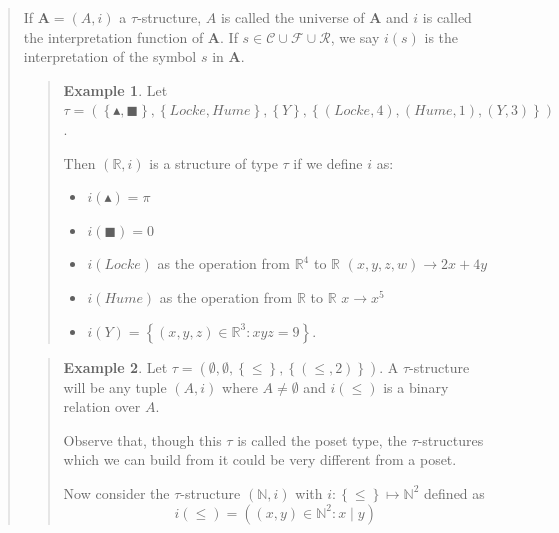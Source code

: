 \documentclass[a4paper, 12pt]{article}
\theoremstyle{definition}
\theoremstyle{definition}
\newtheorem{example}{Example}
\theoremstyle{definition}
\begin{document}
\begin{quote}
If $\textbf{A} = (A, i)$ a $\tau$-structure, $A$ is called the universe of
$\textbf{A}$ and $i$ is called the interpretation function of $\textbf{A}$.
If $s \in \mathcal{C} \cup \mathcal{F} \cup \mathcal{R}$, we say $i(s)$
is the interpretation of the symbol $s$ in $\textbf{A}$.


\small
\begin{quote}

\begin{example}
    Let $\tau = \left( \left\{ \blacktriangle, \blacksquare \right\}, \left\{
    Locke, Hume \right\}, \left\{ Y \right\}, \left\{ (Locke, 4), (Hume, 1),
(Y, 3) \right\}     \right) $.

Then $(\mathbb{R}, i)$ is a structure of type $\tau$ if we define $i$ as: 

\begin{itemize}
    \item $i(\blacktriangle) = \pi$
    \item $i(\blacksquare) = 0$
    \item $i(Locke)$ as the operation from $\mathbb{R}^4$ to $\mathbb{R}$ $(x, y, z, w) \to  2x + 4y$
    \item $i(Hume)$ as the operation from $\mathbb{R}$ to $\mathbb{R}$ $x \to x^5$
    \item $i(Y) = \left\{ (x, y, z) \in \mathbb{R}^3 : xyz = 9 \right\} $.
\end{itemize}
\end{example}

\end{quote}
\normalsize


\small
\begin{quote}

\begin{example}
    Let $\tau = \left( \emptyset, \emptyset, \left\{ \leq \right\}, \left\{
    (\leq, 2) \right\}   \right) $. A $\tau$-structure will be any 
    tuple $(A, i)$ where $A \neq \emptyset$ and $i(\leq)$ is 
    a binary relation over $A$.

    Observe that, though this $\tau$ is called the poset type, 
    the $\tau$-structures which we can build from it could be 
    very different from a poset.

    Now consider the $\tau$-structure $(\mathbb{N}, i)$ with $i : \left\{ \leq \right\} \mapsto \mathbb{N}^2 $ defined as 
    \begin{equation*}
        i(\leq) = \left( (x, y) \in \mathbb{N}^2 : x \mid y \right) 
    \end{equation*}


\end{example}
\end{quote}
\end{quote}
\end{document}
